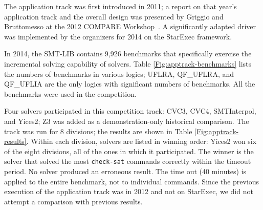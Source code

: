 \documentclass[twoside,11pt]{article}
\begin{document}
The application track was first introduced in 2011; a report on that year's application track and the overall design was presented by Griggio and Bruttomesso at the 2012 COMPARE Workshop~\cite{ag+rb+12}. A significantly adapted driver was implemented by the organizers for 2014 on the StarExec framework.

In 2014, the SMT-LIB contains 9,926 benchmarks that  specifically  exercise the incremental solving capability of solvers. Table \ref{Fig:apptrack-benchmarks} lists the numbers of benchmarks in various logics; UFLRA, QF\_UFLRA, and QF\_UFLIA are the only logics with significant numbers of benchmarks. All the benchmarks were used in the competition.

Four solvers participated in this competition track: CVC3, CVC4, SMTInterpol, and Yices2; Z3 was added as a demonstration-only historical comparison. The track was run for 8 divisions; the results are shown in Table \ref{Fig:apptrack-results}. Within each division, solvers are listed in winning order: Yices2 won six of the eight divisions, all of the ones in which it participated. The winner is the solver that solved the most \lstinline{check-sat} commands correctly within the timeout period. No solver produced an erroneous result. The time out (40 minutes) is applied to the entire benchmark, not to individual commands. Since the previous execution of the application track was in 2012 and not on StarExec, we did not attempt a comparison with previous results.
\end{document}
